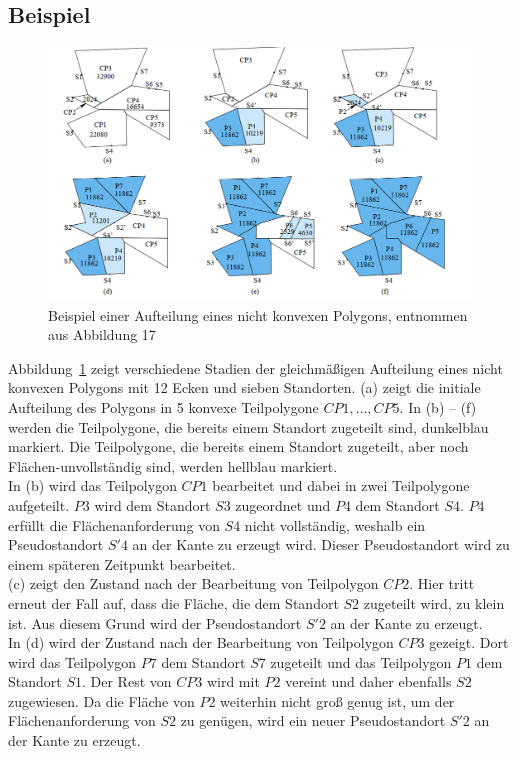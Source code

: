 \documentclass[ngerman]{seminarbeitrag}
\begin{document}
\subsection{Beispiel}\label{beispiel nicht konvex}
\begin{figure}[h]
    \includegraphics[width=1\textwidth]{./Abbildungen/5.png}
    \centering
    \caption{Beispiel einer Aufteilung eines nicht konvexen Polygons, entnommen aus \cite{Hert.1998} Abbildung 17}
    \label{fuenftes beispiel}
\end{figure}
Abbildung~\ref{fuenftes beispiel} zeigt verschiedene Stadien der gleichmäßigen Aufteilung eines nicht konvexen Polygons mit 12 Ecken und sieben Standorten. (a) zeigt die initiale Aufteilung des Polygons in 5 konvexe Teilpolygone $CP1, …,CP5$. In (b) – (f) werden die Teilpolygone, die bereits einem Standort zugeteilt sind, dunkelblau markiert. Die Teilpolygone, die bereits einem Standort zugeteilt, aber noch Flächen-unvollständig sind, werden hellblau markiert.\\
In (b) wird das Teilpolygon $CP1$ bearbeitet und dabei in zwei Teilpolygone aufgeteilt. $P3$ wird dem Standort $S3$ zugeordnet und $P4$ dem Standort $S4$. $P4$ erfüllt die Flächenanforderung von $S4$ nicht vollständig, weshalb ein Pseudostandort $S'4$ an der Kante zu  erzeugt wird. Dieser Pseudostandort wird zu einem späteren Zeitpunkt bearbeitet.\\
 (c) zeigt den Zustand nach der Bearbeitung von Teilpolygon $CP2$. Hier tritt erneut der Fall auf, dass die Fläche, die dem Standort $S2$ zugeteilt wird, zu klein ist. Aus diesem Grund wird der Pseudostandort $S'2$ an der Kante zu  erzeugt.\\
In (d) wird der Zustand nach der Bearbeitung von Teilpolygon $CP3$ gezeigt. Dort wird das Teilpolygon $P7$ dem Standort $S7$ zugeteilt und das Teilpolygon $P1$ dem Standort $S1$. Der Rest von $CP3$ wird mit $P2$ vereint und daher ebenfalls $S2$ zugewiesen. Da die Fläche von $P2$ weiterhin nicht groß genug ist, um der Flächenanforderung von $S2$ zu genügen, wird ein neuer Pseudostandort $S'2$ an der Kante zu  erzeugt.\\
\end{document}
